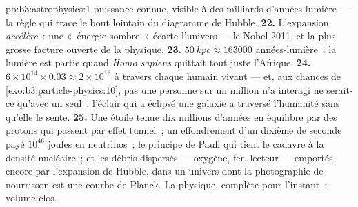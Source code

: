 \begin{solution}{pb:b3:astrophysics:1}
puissance connue, visible à des milliards d'années-lumière --- la
règle qui trace le bout lointain du diagramme de Hubble.
\textbf{22.} L'expansion \emph{accélère}~: une «~énergie sombre~»
écarte l'univers --- le Nobel 2011, et la plus grosse facture
ouverte de la physique.
\textbf{23.} $\qty{50}{kpc} \approx 163000$ années-lumière~: la
lumière est partie quand \emph{Homo sapiens} quittait tout juste
l'Afrique.
\textbf{24.} $6\times10^{14}\times0.03 \approx 2\times10^{13}$ à
travers chaque humain vivant --- et, aux chances de
\cref{exo:b3:particle-physics:10}, pas une personne sur un million
n'a interagi ne serait-ce qu'avec un seul~: l'éclair qui a éclipsé
une galaxie a traversé l'humanité sans qu'elle le sente.
\textbf{25.} Une étoile tenue dix millions d'années en équilibre par
des protons qui passent par effet tunnel~; un effondrement d'un
dixième de seconde payé $10^{46}$ joules en neutrinos~; le principe
de Pauli qui tient le cadavre à la densité nucléaire~; et les débris
dispersés --- oxygène, fer, lecteur --- emportés encore par
l'expansion de Hubble, dans un univers dont la photographie de
nourrisson est une courbe de Planck. La physique, complète pour
l'instant~: volume clos.
\end{solution}
